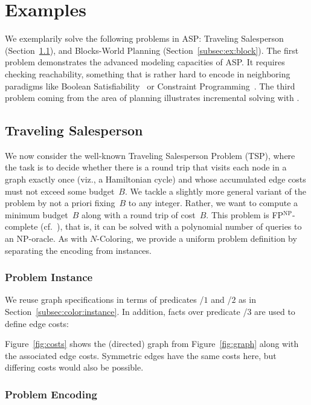 \section{Examples}\label{sec:examples}

We exemplarily solve the following problems in ASP:
Traveling Salesperson (Section~\ref{subsec:ex:tsp}), and
Blocks-World Planning (Section~\ref{subsec:ex:block}).
The first problem demonstrates the advanced modeling capacities of ASP.
It requires checking reachability,
something that is rather hard to encode in neighboring paradigms like
Boolean Satisfiability~\cite{bihemawa08a} or
Constraint Programming~\cite{robewa06a}.
The third problem coming from the area of planning
illustrates incremental solving with \iclingo.
 
\subsection{Traveling Salesperson}\label{subsec:ex:tsp}

We now consider the well-known Traveling Salesperson Problem (TSP),
where the task is to decide whether there is a round trip that visits
each node in a graph exactly once (viz., a Hamiltonian cycle) and whose
accumulated edge costs must not exceed some budget~$B$.
We tackle a slightly more general variant of the problem by not
a priori fixing~$B$ to any integer.
Rather,
we want to compute a minimum budget~$B$ along with a round trip of cost~$B$.
This problem is FP$^\textrm{NP}$-complete (cf.~\cite{papadimitriou94a}),
that is, it can be solved with a polynomial number of queries to an NP-oracle.
As with $N$-Coloring,
we provide a uniform problem definition by separating the encoding from instances.

\subsubsection{Problem Instance}\label{subsec:tsp:instance}


We reuse graph specifications in terms of predicates /$1$ and /$2$
as in Section~\ref{subsec:color:instance}.
In addition, facts over predicate /$3$ are used to define edge costs:
%

%
Figure~\ref{fig:costs} shows the (directed) graph from Figure~\ref{fig:graph}
along with the associated edge costs.
Symmetric edges have the same costs here,
but differing costs would also be possible.


\subsubsection{Problem Encoding}\label{subsec:tsp:encoding}

